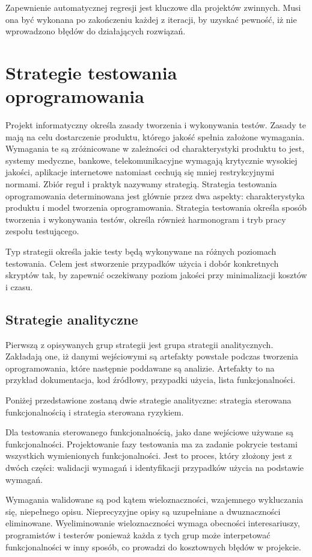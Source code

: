 Zapewnienie automatycznej regresji jest kluczowe dla projektów zwinnych. Musi ona być wykonana po zakończeniu każdej z iteracji, by uzyskać pewność, iż nie wprowadzono błędów do działających rozwiązań.

\section{Strategie testowania oprogramowania}
\label{cha:strategie testowania}
Projekt informatyczny określa zasady tworzenia i wykonywania testów. Zasady te mają na celu dostarczenie produktu, którego jakość spełnia założone wymagania. Wymagania te są zróżnicowane w zależności od charakterystyki produktu to jest, systemy medyczne, bankowe, telekomunikacyjne wymagają krytycznie wysokiej jakości, aplikacje internetowe natomiast cechują się mniej restrykcyjnymi normami. Zbiór reguł i praktyk nazywamy strategią. Strategia testowania oprogramowania determinowana jest głównie przez dwa aspekty: charakterystyka produktu i model tworzenia oprogramowania. 
Strategia testowania określa sposób tworzenia i wykonywania testów, określa również harmonogram i tryb pracy zespołu testującego.

Typ strategii określa jakie testy będą wykonywane na różnych poziomach testowania. Celem jest stworzenie przypadków użycia i dobór konkretnych skryptów tak, by zapewnić oczekiwany poziom jakości przy minimalizacji kosztów i czasu.
\subsection{Strategie analityczne}
Pierwszą z opisywanych grup strategii jest grupa strategii analitycznych. Zakładają one, iż danymi wejściowymi są artefakty powstałe podczas tworzenia oprogramowania, które następnie poddawane są analizie. Artefakty to na przykład dokumentacja, kod źródłowy, przypadki użycia, lista funkcjonalności.

Poniżej przedstawione zostaną dwie strategie analityczne: strategia sterowana funkcjonalnością i strategia sterowana ryzykiem. 

Dla testowania sterowanego funkcjonalnością, jako dane wejściowe używane są funkcjonalności. Projektowanie fazy testowania ma za zadanie pokrycie testami wszystkich wymienionych funkcjonalności. Jest to proces, który złożony jest z dwóch części: walidacji wymagań i identyfikacji przypadków użycia na podstawie wymagań. 

Wymagania walidowane są pod kątem wieloznaczności, wzajemnego wykluczania się, niepełnego opisu. Nieprecyzyjne opisy są uzupełniane a dwuznaczności eliminowane. Wyeliminowanie wieloznaczności wymaga obecności interesariuszy, programistów i testerów ponieważ każda z tych grup może interpetować funkcjonalności w inny sposób, co prowadzi do kosztownych błędów w projekcie.

